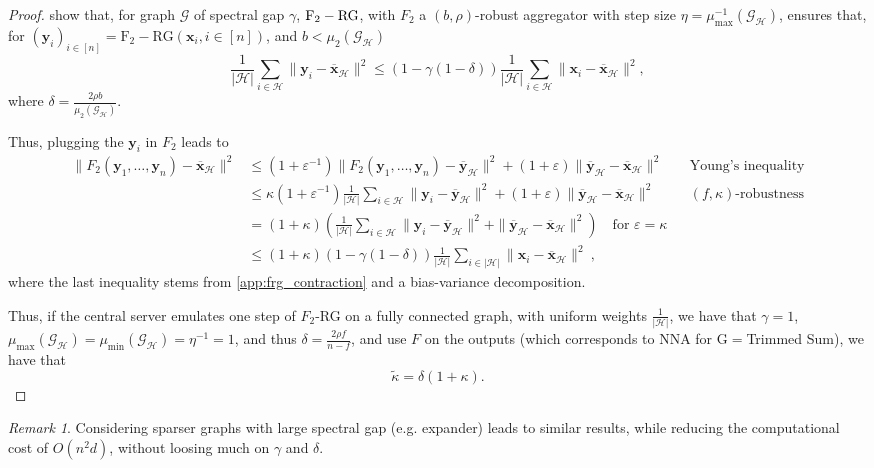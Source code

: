 \documentclass{article}
\def\eps{{\varepsilon}}
\def\vx{{\bm{x}}}
\def\vy{{\bm{y}}}
\newcommand{\cG}{\mathcal{G}}
\newcommand{\cH}{\mathcal{H}}
\theoremstyle{plain}
\theoremstyle{definition}
\theoremstyle{remark}
\newtheorem{remark}[theorem]{Remark}
\begin{document}
\begin{proof}
    
    \citet{gaucher2025unified} show that, for graph $\cG$ of spectral gap $\gamma$, $\rm F_2-RG$, with $F_2$ a $(b,\rho)$-robust aggregator with step size $\eta = \mu_{\max}^{-1}(\cG_{\cH})$, ensures that, for $(\vy_i)_{i \in [n]} = \mathrm{F_2-RG}(\vx_i, i\in [n])$, and $b < \mu_2(\cG_{\cH})$
    \begin{equation}
    \label{app:frg_contraction}
    \frac{1}{|\cH|}\sum_{i\in \cH} \|\vy_i - \overline{\vx}_{\cH}\|^2 \le (1 - \gamma(1 - \delta))\frac{1}{|\cH|}\sum_{i \in \cH}\|\vx_i - \overline{\vx}_{\cH}\|^2,
    \end{equation}
    where $\delta = \frac{2\rho b}{\mu_2(\cG_{\cH})}$.
    
    Thus, plugging the $\vy_i$ in $F_2$ leads to 
    \begin{align*}
        \|F_2(\vy_1,\ldots,\vy_n) - \overline{\vx}_{\cH}\|^2 &\le (1 + \eps^{-1}) \|F_2(\vy_1,\ldots,\vy_n) - \overline{\vy}_{\cH}\|^2 + (1 + \eps) \|\overline{\vy}_{\cH} - \overline{\vx}_{\cH}\|^2 && \text{Young's inequality}\\
        &\le \kappa (1 + \eps^{-1}) \frac{1}{|\cH|}\sum_{i\in\cH}\|\vy_i - \overline{\vy}_{\cH}\|^2 + (1 + \eps) \|\overline{\vy}_{\cH} - \overline{\vx}_{\cH}\|^2 && (f,\kappa)\text{-robustness}\\
        &= (1+\kappa)\left(\frac{1}{|\cH|}\sum_{i\in\cH}\|\vy_i - \overline{\vy}_{\cH}\|^2 + \|\overline{\vy}_{\cH} - \overline{\vx}_{\cH}\|^2 \right) \quad \text{for } \eps = \kappa\\
        &\le (1+\kappa)(1 - \gamma(1-\delta)) \frac{1}{|\cH|}\sum_{i \in |\cH|}\|\vx_i - \overline{\vx}_{\cH}\|^2\ , 
    \end{align*}   
    where the last inequality stems from \cref{app:frg_contraction} and a bias-variance decomposition.

    Thus, if the central server emulates one step of $F_2$-RG on a fully connected graph, with uniform weights $\frac{1}{|\cH|}$, we have that $\gamma=1$, $\mu_{\max}(\cG_{\cH}) = \mu_{\min}(\cG_{\cH}) = \eta^{-1} = 1$, and thus $\delta = \frac{2\rho f}{n-f}$, and use $F$ on the outputs (which corresponds to NNA for G$=$Trimmed Sum), we have that
    \[
    \tilde{\kappa} = \delta(1+\kappa).
    \]
\end{proof}
\begin{remark}
    Considering sparser graphs with large spectral gap (e.g. expander) leads to similar results, while reducing the computational cost of $O(n^2 d)$, without loosing much on $\gamma$ and $\delta$.
\end{remark}
\end{document}
